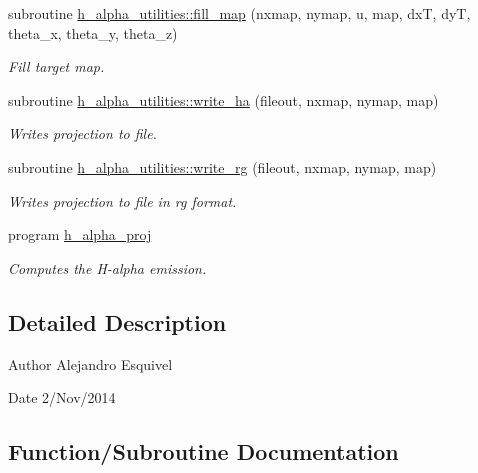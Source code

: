 \begin{DoxyCompactItemize}
subroutine \hyperlink{namespaceh__alpha__utilities_aafc5cae88b562d0bd2d039cae21ed35a}{h\+\_\+alpha\+\_\+utilities\+::fill\+\_\+map} (nxmap, nymap, u, map, dx\+T, dy\+T, theta\+\_\+x, theta\+\_\+y, theta\+\_\+z)
\begin{DoxyCompactList}\small\item\em Fill target map. \end{DoxyCompactList}\item 
subroutine \hyperlink{namespaceh__alpha__utilities_aa2b2b3783ef4b30d178412ea44671047}{h\+\_\+alpha\+\_\+utilities\+::write\+\_\+ha} (fileout, nxmap, nymap, map)
\begin{DoxyCompactList}\small\item\em Writes projection to file. \end{DoxyCompactList}\item 
subroutine \hyperlink{namespaceh__alpha__utilities_a1cf6b2b4be1a68c792b3cb07b5629af6}{h\+\_\+alpha\+\_\+utilities\+::write\+\_\+rg} (fileout, nxmap, nymap, map)
\begin{DoxyCompactList}\small\item\em Writes projection to file in rg format. \end{DoxyCompactList}\item 
program \hyperlink{h__alpha__proj_8f90_ae4326230e4f19e2e66573778f131e5c3}{h\+\_\+alpha\+\_\+proj}
\begin{DoxyCompactList}\small\item\em Computes the H-\/alpha emission. \end{DoxyCompactList}\end{DoxyCompactItemize}


\subsection{Detailed Description}
\begin{DoxyAuthor}{Author}
Alejandro Esquivel 
\end{DoxyAuthor}
\begin{DoxyDate}{Date}
2/\+Nov/2014 
\end{DoxyDate}


\subsection{Function/\+Subroutine Documentation}
\hypertarget{h__alpha__proj_8f90_ae4326230e4f19e2e66573778f131e5c3}{}
